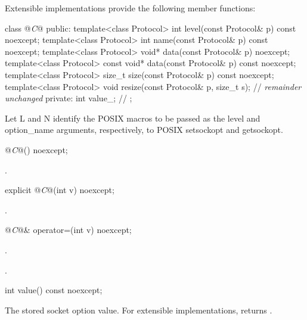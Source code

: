 \pnum
 Extensible implementations provide the following member functions:

\begin{codeblock}
class @\textit{C}@
{
public:
  template<class Protocol> int level(const Protocol& p) const noexcept;
  template<class Protocol> int name(const Protocol& p) const noexcept;
  template<class Protocol> void* data(const Protocol& p) noexcept;
  template<class Protocol> const void* data(const Protocol& p) const noexcept;
  template<class Protocol> size_t size(const Protocol& p) const noexcept;
  template<class Protocol> void resize(const Protocol& p, size_t s);
  // \textit{remainder unchanged}
private:
  int value_; // \expos
};
\end{codeblock}

\pnum
Let L and N identify the POSIX macros to be passed as the level and option_name arguments, respectively, to POSIX setsockopt and getsockopt.

\begin{itemdecl}
@\textit{C}@() noexcept;
\end{itemdecl}

\begin{itemdescr}
\pnum
\postconditions {}.
\end{itemdescr}

\begin{itemdecl}
explicit @\textit{C}@(int v) noexcept;
\end{itemdecl}

\begin{itemdescr}
\pnum
\postconditions {}.
\end{itemdescr}

\begin{itemdecl}
@\textit{C}@& operator=(int v) noexcept;
\end{itemdecl}

\begin{itemdescr}
\pnum
\returns {}.

\pnum
\postconditions {}.
\end{itemdescr}

\begin{itemdecl}
int value() const noexcept;
\end{itemdecl}

\begin{itemdescr}
\pnum
\returns The stored socket option value. For extensible implementations, returns .
\end{itemdescr}

